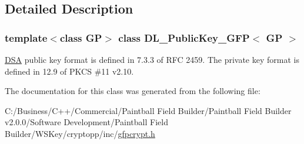 \subsection{Detailed Description}
\subsubsection*{template$<$class GP$>$ class DL\_\-PublicKey\_\-GFP$<$ GP $>$}

\hyperlink{struct_d_s_a}{DSA} public key format is defined in 7.3.3 of RFC 2459. The private key format is defined in 12.9 of PKCS \#11 v2.10. 

The documentation for this class was generated from the following file:\begin{DoxyCompactItemize}
\item 
C:/Business/C++/Commercial/Paintball Field Builder/Paintball Field Builder v2.0.0/Software Development/Paintball Field Builder/WSKey/cryptopp/inc/\hyperlink{gfpcrypt_8h}{gfpcrypt.h}\end{DoxyCompactItemize}

